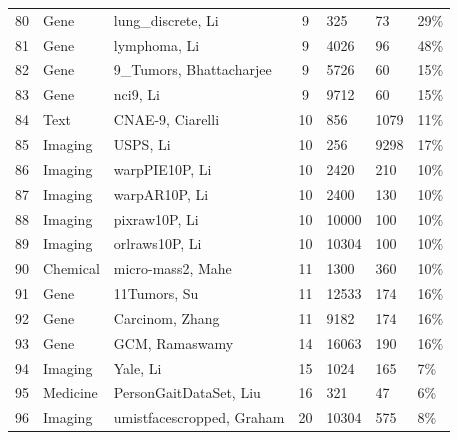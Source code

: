 \documentclass[preprint,12pt,authoryear]{elsarticle}
\begin{document}
{{\begin{longtable}{|c|p{1.9cm}|p{6.7cm}|c|p{0.75cm}|p{0.75cm}|p{0.75cm}|}
80  & Gene       & lung\_discrete, Li \citeyearpar{li2017feature}               & 9 & 325   & 73   & 29\% \\
81  & Gene       & lymphoma, Li \citeyearpar{li2017feature}                     & 9 & 4026  & 96   & 48\% \\
82  & Gene       & 9\_Tumors, Bhattacharjee \citeyearpar{bhattacharjee2001classification}  & 9 & 5726  & 60   & 15\% \\
83  & Gene       & nci9, Li \citeyearpar{li2017feature}                         & 9 & 9712  & 60   & 15\% \\ \hline
84  & Text       & CNAE-9, Ciarelli \citeyearpar{cnae-9_233}                          & 10 & 856   & 1079 & 11\% \\
85  & Imaging    & USPS, Li \citeyearpar{li2017feature}                         & 10 & 256   & 9298 & 17\% \\
86  & Imaging    & warpPIE10P, Li \citeyearpar{li2017feature}                   & 10 & 2420  & 210  & 10\% \\
87  & Imaging    & warpAR10P, Li \citeyearpar{li2017feature}                    & 10 & 2400  & 130  & 10\% \\
88  & Imaging    & pixraw10P, Li \citeyearpar{li2017feature}                    & 10 & 10000 & 100  & 10\% \\
89  & Imaging    & orlraws10P, Li \citeyearpar{li2017feature}                   & 10 & 10304 & 100  & 10\% \\ \hline
90  & Chemical   & micro-mass2, Mahe \citeyearpar{mahe2014automatic}              & 11 & 1300  & 360  & 10\% \\
91  & Gene       & 11Tumors, Su \citeyearpar{su2001molecular}                   & 11 & 12533 & 174  & 16\% \\
92  & Gene       & Carcinom, Zhang \citeyearpar{zhang2019unsupervised}             & 11 & 9182  & 174  & 16\% \\ \hline
93  & Gene       & GCM, Ramaswamy \citeyearpar{ramaswamy2001multiclass}                & 14 & 16063 & 190  & 16\% \\ \hline
94  & Imaging    & Yale, Li \citeyearpar{li2017feature}                         & 15 & 1024  & 165  & 7\%  \\ \hline
95  & Medicine   & PersonGaitDataSet, Liu \citeyearpar{gait_classification_604}  & 16 & 321   & 47   & 6\%  \\ \hline
96  & Imaging    & umistfacescropped, Graham \citeyearpar{graham1998characterising}  & 20 & 10304 & 575  & 8\%  \\

\end{longtable}}}
\end{document}

